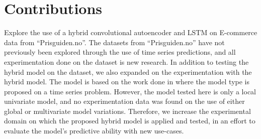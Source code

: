 
\section{Contributions}
\label{section:Discussion:Contributions}

Explore the use of a hybrid convolutional autoencoder and LSTM on E-commerce data from ``Prisguiden.no''.
The datasets from ``Prisguiden.no'' have not previously been explored through the use of time series predictions,
and all experimentation done on the dataset is new research.
In addition to testing the hybrid model on the dataset,
we also expanded on the experimentation with the hybrid model.
The model is based on the work done in \cite{Zhao2019} where the model type is proposed on a time series problem.
However, the model tested here is only a local univariate model, and no experimentation data was found
on the use of either global or multivariate model variations.
Therefore, we increase the experimental domain on which the proposed hybrid model is applied and tested,
in an effort to evaluate the model's predictive ability with new use-cases.

